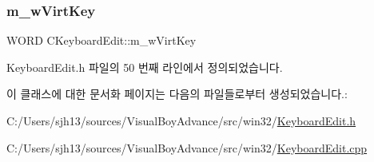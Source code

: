\subsubsection{\texorpdfstring{m\+\_\+w\+Virt\+Key}{m\_wVirtKey}}
{\footnotesize\ttfamily W\+O\+RD C\+Keyboard\+Edit\+::m\+\_\+w\+Virt\+Key}



Keyboard\+Edit.\+h 파일의 50 번째 라인에서 정의되었습니다.



이 클래스에 대한 문서화 페이지는 다음의 파일들로부터 생성되었습니다.\+:\begin{DoxyCompactItemize}
\item 
C\+:/\+Users/sjh13/sources/\+Visual\+Boy\+Advance/src/win32/\mbox{\hyperlink{_keyboard_edit_8h}{Keyboard\+Edit.\+h}}\item 
C\+:/\+Users/sjh13/sources/\+Visual\+Boy\+Advance/src/win32/\mbox{\hyperlink{_keyboard_edit_8cpp}{Keyboard\+Edit.\+cpp}}\end{DoxyCompactItemize}
